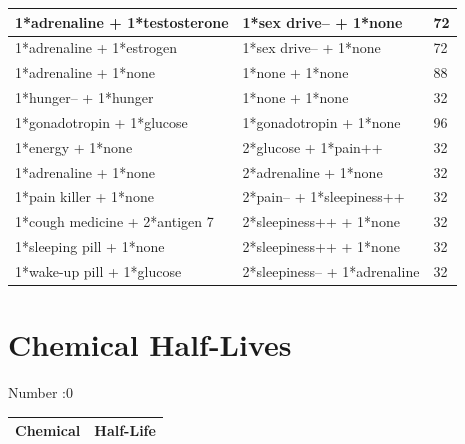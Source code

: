 \documentclass{article}
\begin{document}
\begin{longtable}{|p{7cm}|p{7cm}|p{2cm}|}
1*adrenaline + 1*testosterone & 1*sex drive-- + 1*none & 72 \\ \hline
1*adrenaline + 1*estrogen & 1*sex drive-- + 1*none & 72 \\ \hline
1*adrenaline + 1*none & 1*none + 1*none & 88 \\ \hline
1*hunger-- + 1*hunger & 1*none + 1*none & 32 \\ \hline
1*gonadotropin + 1*glucose & 1*gonadotropin + 1*none & 96 \\ \hline
1*energy + 1*none & 2*glucose + 1*pain++ & 32 \\ \hline
1*adrenaline + 1*none & 2*adrenaline + 1*none & 32 \\ \hline
1*pain killer + 1*none & 2*pain-- + 1*sleepiness++ & 32 \\ \hline
1*cough medicine + 2*antigen 7 & 2*sleepiness++ + 1*none & 32 \\ \hline
1*sleeping pill + 1*none & 2*sleepiness++ + 1*none & 32 \\ \hline
1*wake-up pill + 1*glucose & 2*sleepiness-- + 1*adrenaline & 32 \\ \hline
\end{longtable}

\newpage

\section*{Chemical Half-Lives}

Number :0

\begin{longtable}{|p{4cm}|p{4cm}|}
\hline
{\bf Chemical} & {\bf Half-Life} \\ \hline
\end{longtable}
\end{document}
